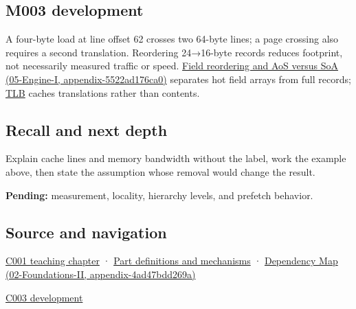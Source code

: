 \subsection{M003 development}\label{appendix-e4ccdbab8320-m003-development}

A four-byte load at line offset 62 crosses two 64-byte lines; a page crossing also requires a second translation. Reordering 24→16-byte records reduces footprint, not necessarily measured traffic or speed. \href{../05-Engine-I/main.pdf\#nameddest=appendix-5522ad176ca0}{Field reordering and AoS versus SoA (05-Engine-I, appendix-5522ad176ca0)} separates hot field arrays from full records; \hyperref[appendix-7a2d9c5ce511]{TLB} caches translations rather than contents.

\subsection{Recall and next depth}\label{appendix-e4ccdbab8320-recall-and-next-depth}

Explain cache lines and memory bandwidth without the label, work the example above, then state the assumption whose removal would change the result.

\textbf{Pending:} measurement, locality, hierarchy levels, and prefetch behavior.

\subsection{Source and navigation}\label{appendix-e4ccdbab8320-source-and-navigation}

\hyperref[01-foundations-i-ch001-from-a-signal-to-an-interpretation]{C001 teaching chapter} · \hyperref[appendix-fd090d982a15]{Part definitions and mechanisms} · \href{../02-Foundations-II/main.pdf\#nameddest=appendix-4ad47bdd269a}{Dependency Map (02-Foundations-II, appendix-4ad47bdd269a)}

\hyperref[01-foundations-i-ch002-where-the-bytes-live]{C003 development}
